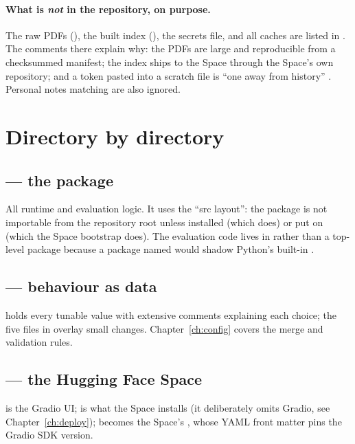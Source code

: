 \paragraph{What is \emph{not} in the repository, on purpose.} The raw PDFs (), the built index (), the  secrets file, and all caches are listed in . The comments there explain why: the PDFs are large and reproducible from a checksummed manifest; the index ships to the Space through the Space's own repository; and a token pasted into a scratch file is ``one  away from history'' . Personal notes matching  are also ignored.

\section{Directory by directory}

\subsection{\texorpdfstring{}{src/vidyarag/} --- the package}
All runtime and evaluation logic. It uses the ``src layout'': the package is not importable from the repository root unless installed (which  does) or put on  (which the Space bootstrap does). The evaluation code lives in  rather than a top-level  package because a package named  would shadow Python's built-in  .

\subsection{\texorpdfstring{}{config/} --- behaviour as data}
 holds every tunable value with extensive comments explaining each choice; the five files in  overlay small changes. Chapter~\ref{ch:config} covers the merge and validation rules.

\subsection{\texorpdfstring{}{app/} --- the Hugging Face Space}
 is the Gradio UI;  is what the Space installs (it deliberately omits Gradio, see Chapter~\ref{ch:deploy});  becomes the Space's , whose YAML front matter pins the Gradio SDK version.

